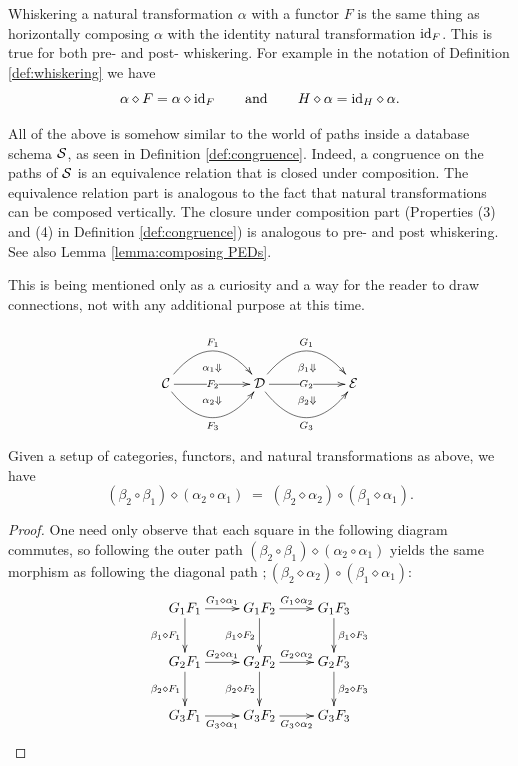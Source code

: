 \begin{remark}

Whiskering a natural transformation $\alpha$ with a functor $F$ is the same thing as horizontally composing $\alpha$ with the identity natural transformation $\textnormal{id}_F$. This is true for both pre- and post- whiskering. For example in the notation of Definition \ref{def:whiskering} we have 
$$\alpha\diamond F = \alpha\diamond\textnormal{id}_F\hspace{.3in}\textnormal{and}\hspace{.3in} H\diamond\alpha=\textnormal{id}_H\diamond\alpha.$$

\end{remark}

\begin{remark}

All of the above is somehow similar to the world of paths inside a database schema $\mathcal{S}$, as seen in Definition \ref{def:congruence}. Indeed, a congruence on the paths of $\mathcal{S}$ is an equivalence relation that is closed under composition. The equivalence relation part is analogous to the fact that natural transformations can be composed vertically. The closure under composition part (Properties (3) and (4) in Definition \ref{def:congruence}) is analogous to pre- and post whiskering. See also Lemma \ref{lemma:composing PEDs}. 

This is being mentioned only as a curiosity and a way for the reader to draw connections, not with any additional purpose at this time.

\end{remark}

\begin{theorem}
$$
\xymatrix{
&\ar@{}[d]|(.65){\alpha_1\Down}&&\ar@{}[d]|(.65){\beta_1\Down}\\
\mcC\ar@/^2pc/[rr]^{F_1}\ar[rr]|{F_2}\ar@/_2pc/[rr]_{F_3}&&\mcD\ar@/^2pc/[rr]^{G_1}\ar[rr]|{G_2}\ar@/_2pc/[rr]_{G_3}&&\mcE\\
&\ar@{}[u]|(.65){\alpha_2\Down}&&\ar@{}[u]|(.65){\beta_2\Down}}
$$
Given a setup of categories, functors, and natural transformations as above, we have
$$(\beta_2\circ\beta_1)\diamond(\alpha_2\circ\alpha_1)\;=\;(\beta_2\diamond\alpha_2)\circ(\beta_1\diamond\alpha_1).$$

\end{theorem}

\begin{proof}

One need only observe that each square in the following diagram commutes, so following the outer path $(\beta_2\circ\beta_1)\diamond(\alpha_2\circ\alpha_1)$ yields the same morphism as following the diagonal path $;(\beta_2\diamond\alpha_2)\circ(\beta_1\diamond\alpha_1)$:
$$
\xymatrix{
G_1F_1\ar[r]^{G_1\diamond\alpha_1}\ar[d]_{\beta_1\diamond F_1}&G_1F_2\ar[r]^{G_1\diamond\alpha_2}\ar[d]_{\beta_1\diamond F_2}&G_1F_3\ar[d]^{\beta_1\diamond F_3}\\
G_2F_1\ar[r]^{G_2\diamond\alpha_1}\ar[d]_{\beta_2\diamond F_1}&G_2F_2\ar[r]^{G_2\diamond\alpha_2}\ar[d]_{\beta_2\diamond F_2}&G_2F_3\ar[d]^{\beta_2\diamond F_3}\\
G_3F_1\ar[r]_{G_3\diamond\alpha_1}&G_3F_2\ar[r]_{G_3\diamond\alpha_2}&G_3F_3
}
$$


\end{proof}

